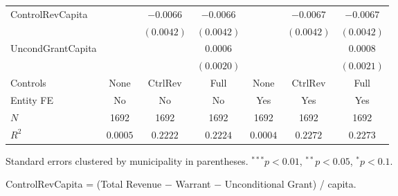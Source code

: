 \documentclass[border=10pt,varwidth=25cm]{standalone}
\renewenvironment{table}[1][]{}{}
\begin{document}
\begin{table}[H]
\begin{minipage}{\textwidth}
\begin{tabular}{lcccccc}
        ControlRevCapita &  & $-0.0066$ & $-0.0066$ &  & $-0.0067$ & $-0.0067$ \\
         &  & $(0.0042)$ & $(0.0042)$ &  & $(0.0042)$ & $(0.0042)$ \\[4pt]
        UncondGrantCapita &  &  & $0.0006$ &  &  & $0.0008$ \\
         &  &  & $(0.0020)$ &  &  & $(0.0021)$ \\[4pt]
        \midrule
        Controls & None & CtrlRev & Full & None & CtrlRev & Full \\
        Entity FE & No & No & No & Yes & Yes & Yes \\
        $N$ & 1692 & 1692 & 1692 & 1692 & 1692 & 1692 \\
        $R^2$ & $0.0005$ & $0.2222$ & $0.2224$ & $0.0004$ & $0.2272$ & $0.2273$ \\
        \bottomrule
    \end{tabular}

    \vspace{6pt}
    {\scriptsize Standard errors clustered by municipality in parentheses. $^{***}p<0.01$, $^{**}p<0.05$, $^{*}p<0.1$.}

    {\scriptsize ControlRevCapita = (Total Revenue $-$ Warrant $-$ Unconditional Grant) / capita.}
    \end{minipage}
\end{table}
\end{document}
